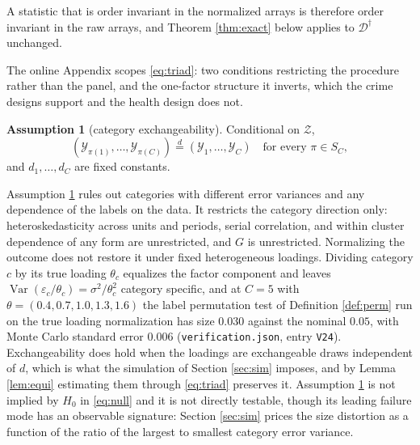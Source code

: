 \documentclass[12pt]{article}
\theoremstyle{definition}
\newtheorem{assumption}{Assumption}
\numberwithin{equation}{section}
\begin{document}
A statistic that is order invariant in the normalized arrays is therefore
order invariant in the raw arrays, and Theorem \ref{thm:exact} below applies to
$\mathcal{D}^{\dagger}$ unchanged.

The online Appendix scopes \eqref{eq:triad}: two conditions restricting the
procedure rather than the panel, and the one-factor structure it inverts,
which the crime designs support and the health design does not.

\begin{assumption}[category exchangeability]
\label{as:CE}
Conditional on $\mathcal{Z}$,
\[
(\mathcal{Y}_{\pi(1)},\dots,\mathcal{Y}_{\pi(C)})
  \overset{d}{=} (\mathcal{Y}_1,\dots,\mathcal{Y}_C)
\quad\text{for every } \pi \in S_C,
\]
and $d_1,\dots,d_C$ are fixed constants.
\end{assumption}

Assumption \ref{as:CE} rules out categories with different error variances and
any dependence of the labels on the data. It restricts the category direction
only: heteroskedasticity across units and periods, serial correlation, and
within cluster dependence of any form are unrestricted, and $G$ is unrestricted.
Normalizing the outcome does not restore it under fixed heterogeneous loadings.
Dividing category $c$ by its true loading $\theta_c$ equalizes the factor
component and leaves $\operatorname{Var}(\varepsilon_c/\theta_c) =
\sigma^2/\theta_c^2$ category specific, and at $C = 5$ with
$\theta = (0.4,0.7,1.0,1.3,1.6)$ the label permutation test of Definition
\ref{def:perm} run on the true loading normalization has size $0.030$ against
the nominal $0.05$, with Monte Carlo standard error $0.006$
(\texttt{verification.json}, entry \texttt{V24}). Exchangeability
does hold when the loadings are exchangeable draws independent of $d$, which is
what the simulation of Section \ref{sec:sim} imposes, and by Lemma
\ref{lem:equi} estimating them through \eqref{eq:triad} preserves it.
Assumption \ref{as:CE} is not implied by $H_0$ in \eqref{eq:null} and it is not
directly testable, though its leading failure mode has an observable signature:
Section \ref{sec:sim} prices the size distortion as a function of the ratio of
the largest to smallest category error variance.
\end{document}
